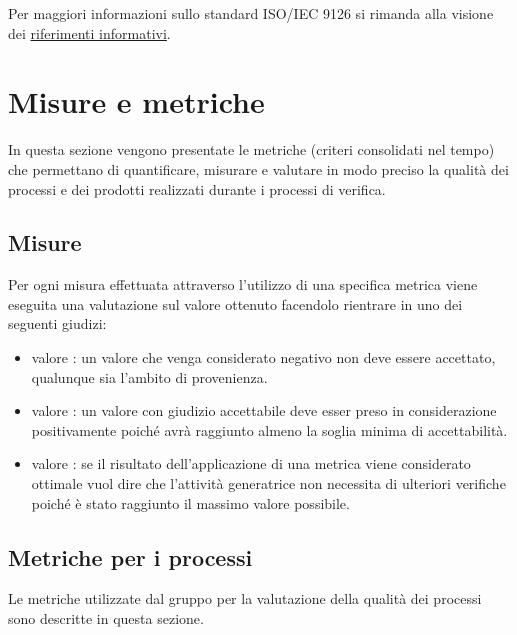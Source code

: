 \documentclass[a4paper, titlepage]{article}
\begin{document}
Per maggiori informazioni sullo standard ISO/IEC 9126 si rimanda alla visione dei \hyperref[rifinfo] {riferimenti informativi}.

\newpage
\appendix
\section{Misure e metriche}
\label{sec:metr}
In questa sezione vengono presentate le metriche (criteri consolidati nel tempo) che permettano di quantificare, misurare e valutare in modo preciso la qualità dei processi e dei prodotti realizzati durante i processi di verifica.

\subsection{Misure}
Per ogni misura effettuata attraverso l'utilizzo di una specifica metrica viene eseguita una valutazione sul valore ottenuto facendolo rientrare in uno dei seguenti giudizi:
\begin{itemize}
	\item valore : un valore che venga considerato negativo non deve essere accettato, qualunque sia l'ambito di provenienza.
	\item valore : un valore con giudizio accettabile deve esser preso in considerazione positivamente poiché avrà raggiunto almeno la soglia minima di accettabilità.
	\item valore : se il risultato dell'applicazione di una metrica viene considerato ottimale vuol dire che l'attività generatrice non necessita di ulteriori verifiche poiché è stato raggiunto il massimo valore possibile.
\end{itemize} 

\subsection{Metriche per i processi}
Le metriche utilizzate dal gruppo per la valutazione della qualità dei processi sono descritte in questa sezione.
\end{document}

